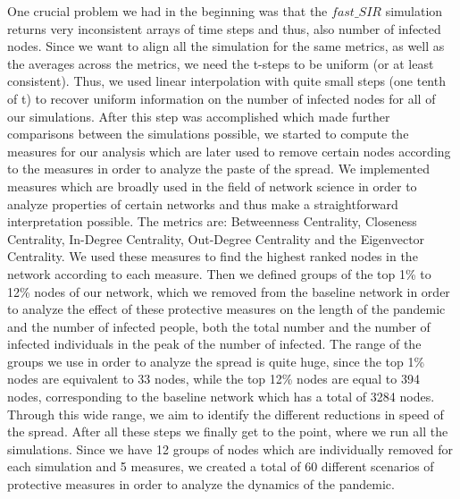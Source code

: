 \documentclass{Resources/netsci-project}
\begin{document}
One crucial problem we had in the beginning was that the $fast\_SIR$ simulation returns very inconsistent arrays of time steps and thus, also number of infected nodes. Since we want to align all the simulation for the same metrics, as well as the averages across the metrics, we need the t-steps to be uniform (or at least consistent). Thus, we used linear interpolation with quite small steps (one tenth of t) to recover uniform information on the number of infected nodes for all of our simulations. After this step was accomplished which made further comparisons between the simulations possible, we started to compute the measures for our analysis which are later used to  remove certain nodes according to the measures in order to analyze the paste of the spread. We implemented measures which are broadly used in the field of network science in order to analyze properties of certain networks and thus make a straightforward interpretation possible. The metrics are: Betweenness Centrality, Closeness Centrality, In-Degree Centrality, Out-Degree Centrality and the Eigenvector Centrality. We used these measures to find the highest ranked nodes in the network according to each measure. Then we defined groups of the top 1\% to 12\% nodes of our network, which we removed from the baseline network in order to analyze the effect of these protective measures on the length of the pandemic and the number of infected people, both the total number and the number of infected individuals in the peak of the number of infected. The range of the groups we use in order to analyze the spread is quite huge, since the top 1\% nodes are equivalent to 33 nodes, while the top 12\% nodes are equal to 394 nodes, corresponding to the baseline network which has a total of 3284 nodes. Through this wide range, we aim to identify the different reductions in speed of the spread. After all these steps we finally get to the point, where we run all the simulations. Since we have 12 groups of nodes which are individually removed for each simulation and 5 measures, we created a total of 60 different scenarios of protective measures in order to analyze the dynamics of the pandemic. 
\end{document}
